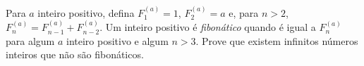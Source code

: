 Para $a$ inteiro positivo, defina $F^{(a)}_1 = 1$, $F^{(a)}_2 = a$ e, para $n > 2$, $F^{(a)}_n = F^{(a)}_{n-1} + F^{(a)}_{n-2}$. Um inteiro positivo é \emph{fibonático} quando é igual a $F^{(a)}_n$ para algum $a$ inteiro positivo e algum $n > 3$. Prove que existem infinitos números inteiros que não são fibonáticos.

